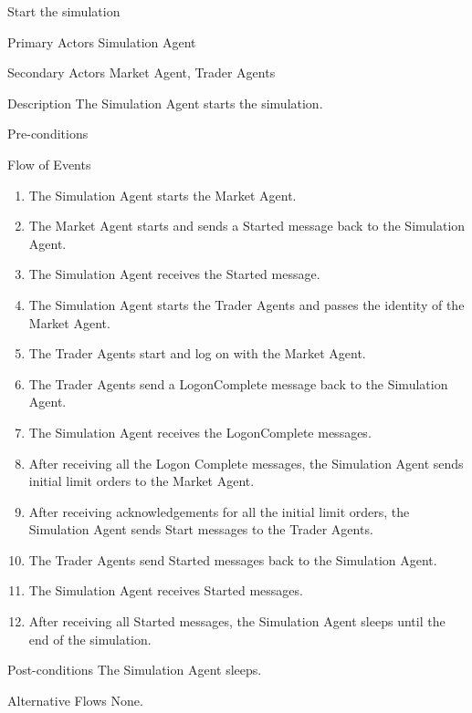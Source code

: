\begin{usecase}{Start the simulation}
\item[Primary Actors] Simulation Agent
\item[Secondary Actors] Market Agent, Trader Agents
\item[Description] The Simulation Agent starts the simulation.
\item[Pre-conditions] 
\item[Flow of Events] 
\begin{enumerate}
\item The Simulation Agent starts the Market Agent.
\item The Market Agent starts and sends a Started message back to the Simulation Agent.
\item The Simulation Agent receives the Started message.
\item The Simulation Agent starts the Trader Agents and passes the identity of the Market Agent.
\item The Trader Agents start and log on with the Market Agent.
\item The Trader Agents send a LogonComplete message back to the Simulation Agent.
\item The Simulation Agent receives the LogonComplete messages.
\item After receiving all the Logon Complete messages, the Simulation Agent sends initial limit orders to the Market Agent.
\item After receiving acknowledgements for all the initial limit orders, the Simulation Agent sends Start messages to the Trader Agents.
\item The Trader Agents send Started messages back to the Simulation Agent.
\item The Simulation Agent receives Started messages.
\item After receiving all Started messages, the Simulation Agent sleeps until the end of the simulation.
\end{enumerate}
\item[Post-conditions] The Simulation Agent sleeps.
\item[Alternative Flows] None. 
\end{usecase}
  
